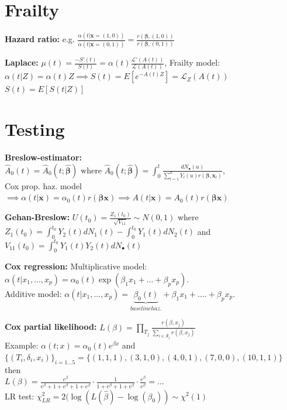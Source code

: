 \documentclass{article}
\begin{document}
\newpage

\section*{Frailty}

\textbf{Hazard ratio:} e.g. $\frac{\alpha(t|\mathbf{x} =(1,0))}{\alpha(t|\mathbf{x} =(0,1))} = \frac{r(\mathbf{\beta}, (1,0))}{r(\mathbf{\beta}, (0,1))}$

\textbf{Laplace:} $\mu(t) = \frac{-S'(t)}{S(t)} = \alpha(t)\frac{\mathcal{L}'(A(t))}{\mathcal{L}(A(t))}$, Frailty model:  $\alpha(t|Z) = \alpha(t)Z \implies S(t)=E[e^{-A(t)Z}] = \mathcal{L}_Z(A(t))$\\
$S(t) = E[S(t|Z)]$

\newpage

\section*{Testing}

\textbf{Breslow-estimator:} $\hat A_0(t) = \hat A_0(t;\hat{\mathbf{\beta}}) \text{ where } 
\hat A_0(t;\hat{\mathbf{\beta}}) = \int_0^t\frac{dN_{\bullet}(u)}{\sum_{l=1}^n Y_l(u)r(\mathbf{\beta}, \mathbf{x}_l)}$, \\ 
Cox prop. haz. model $\implies \alpha(t | \mathbf{x}) = \alpha_0(t)r(\mathbf{\beta}\mathbf{x}) \implies A(t | \mathbf{x}) = A_0(t)r(\mathbf{\beta}\mathbf{x})$

\textbf{Gehan-Breslow:}
$U(t_0) = \frac{Z_1(t_0)}{\sqrt{V_{11}}} \sim N(0,1)$ where 
$Z_1(t_0) = \int_0^{t_0} Y_2(t)dN_1(t) -\int_0^{t_0} Y_1(t)dN_2(t)$ and 
$V_{11}(t_0) = \int_0^{t_0} Y_1(t)Y_2(t)dN_{\bullet}(t)$

\textbf{Cox regression:} Multiplicative model: $\alpha(t|x_1,...,x_p) = \alpha_0(t)\exp (\beta_1x_1+...+\beta_px_p)$. \\
Additive model:  $\alpha(t|x_1,...,x_p) = \underbrace{\beta_0(t)}_{baseline haz.} + \beta_1 x_1 + ....+ \beta_p x_p$.

\textbf{Cox partial likelihood:}
$L(\beta) = \prod_{T_j} \frac{r(\beta, x_j)}{\sum_{i \in \mathcal{R}_j} r(\beta, x_j)}$ \\
Example: $\alpha(t; x) = \alpha_0(t)e^{\beta x}$ and 
$\{(T_i, \delta_i, x_i)\}_{i=1...5} = \{(1, 1, 1),(3, 1, 0),(4, 0, 1),(7, 0, 0),(10, 1, 1) \}$ then \\ $L(\beta) = \frac{e^{\beta}}{e^{\beta}+1+e^{\beta}+1+e^{\beta}} \cdot \frac{1}{1+e^{\beta}+1+e^{\beta}} \cdot \frac{e^{\beta}}{e^{\beta}} = ...$ \\
LR test: $\chi^2_{LR} = 2(\log (L(\hat{\beta}) - \log(\beta_0)) \sim \chi^2(1)$
\end{document}
